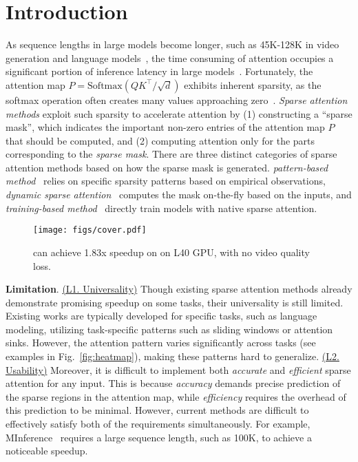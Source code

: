 
\section{Introduction}  \label{sec:intro} 
As sequence lengths in large models become longer, such as 45K-128K in video generation and language models~\cite{yang2024cogvideox, bao2024vidu, llama31model}, the time consuming of attention occupies a significant portion of inference latency in large models~\cite{2024sageattention}. 
Fortunately, the attention map $P = \mathrm{Softmax}(QK^\top / \sqrt{d}) $ exhibits inherent sparsity, as the softmax operation often creates many values approaching zero~\cite{deng2024attention}. \emph{Sparse attention methods} exploit such sparsity to accelerate attention by (1) constructing a ``sparse mask'', which indicates the important non-zero entries of the attention map $P$ that should be computed, and (2) computing attention only for the parts corresponding to the \emph{sparse mask}. There are three distinct categories of sparse attention methods based on how the sparse mask is generated. \emph{pattern-based method}~\cite{zhang2023h2o, xiao2024infllm, moaattention, zhu2024sampleattention, xiao2024duoattention, xiao2023efficient} relies on specific sparsity patterns based on empirical observations, \emph{dynamic sparse attention}~\cite{ribar2023sparq,singhania2024loki,jiang2407minference,FlexPrefill,gao2024seerattention} computes the mask on-the-fly based on the inputs, and \emph{training-based method}~\cite{kitaev2020reformer,pagliardini2023fast} directly train models with native sparse attention.
\begin{figure}[!t]
    \centering
    \texttt{[image: figs/cover.pdf]}
    \vspace{-2em}
    \caption{\our can achieve 1.83x speedup on \mochi on L40 GPU, with no video quality loss.}
    \vspace{-1.64em}
    \label{fig:cover}
\end{figure}

\textbf{Limitation}. \uline{(L1. Universality)} Though existing sparse attention methods already demonstrate promising speedup on some tasks, their universality is still limited. Existing works are typically developed for specific tasks, such as language modeling, utilizing task-specific patterns such as sliding windows or attention sinks. However, the attention pattern varies significantly across tasks (see examples in Fig.~\ref{fig:heatmap}), making these patterns hard to generalize. \uline{(L2. Usability)} Moreover, it is difficult to implement both \emph{accurate} and \emph{efficient} sparse attention for any input. This is because \emph{accuracy} demands precise prediction of the sparse regions in the attention map, while \emph{efficiency} requires the overhead of this prediction to be minimal. However, current methods are difficult to effectively satisfy both of the requirements simultaneously. For example, MInference~\cite{jiang2407minference} requires a large sequence length, such as 100K, to achieve a noticeable speedup.




